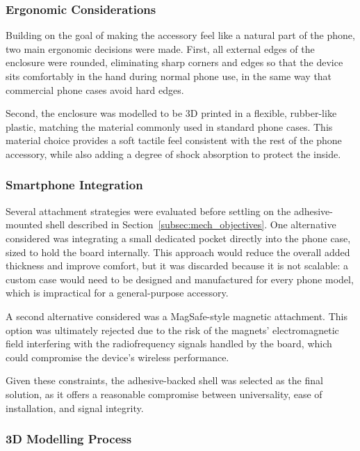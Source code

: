 \documentclass[english,bachelor]{tfgitic}[2026/01/22]
\begin{document}
\subsubsection{Ergonomic Considerations}

Building on the goal of making the accessory feel like a natural part of the phone, two main ergonomic decisions were made. First, all external edges of the enclosure were rounded, eliminating sharp corners and edges so that the device sits comfortably in the hand during normal phone use, in the same way that commercial phone cases avoid hard edges.

Second, the enclosure was modelled to be 3D printed in a flexible, rubber-like plastic, matching the material commonly used in standard phone cases. This material choice provides a soft tactile feel consistent with the rest of the phone accessory, while also adding a degree of shock absorption to protect the  inside.

\subsubsection{Smartphone Integration}

Several attachment strategies were evaluated before settling on the adhesive-mounted shell described in Section~\ref{subsec:mech_objectives}. One alternative considered was integrating a small dedicated pocket directly into the phone case, sized to hold the board internally. This approach would reduce the overall added thickness and improve comfort, but it was discarded because it is not scalable: a custom case would need to be designed and manufactured for every phone model, which is impractical for a general-purpose accessory.

A second alternative considered was a MagSafe-style magnetic attachment. This option was ultimately rejected due to the risk of the magnets' electromagnetic field interfering with the radiofrequency signals handled by the board, which could compromise the device's wireless performance.

Given these constraints, the adhesive-backed shell was selected as the final solution, as it offers a reasonable compromise between universality, ease of installation, and signal integrity.


\subsubsection{3D Modelling Process}
\end{document}
